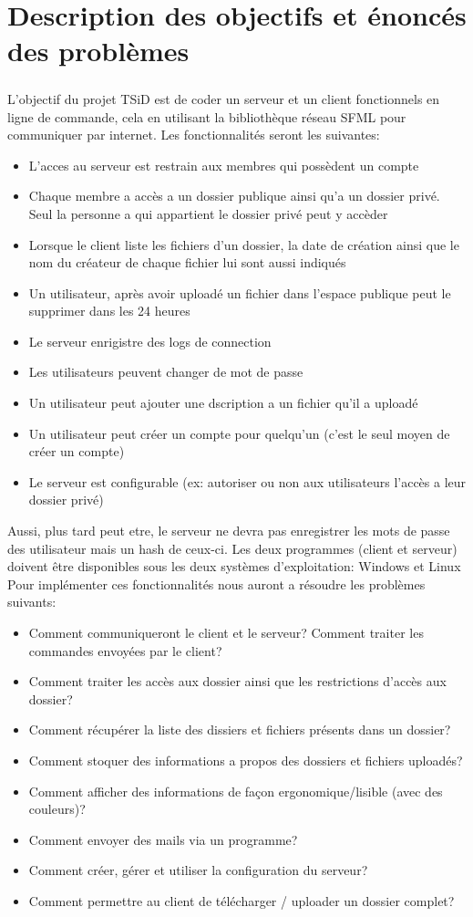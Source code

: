 \documentclass[12pt,a4paper,twoside]{article}
\begin{document}
	\section{Description des objectifs et énoncés des problèmes} %
		\subparagraph*{}
			L'objectif du projet TSiD est de coder un serveur et un client fonctionnels en ligne de commande, cela en utilisant la bibliothèque réseau SFML pour communiquer par internet.
			Les fonctionnalités seront les suivantes:
			\begin{itemize}
				\item{} L'acces au serveur est restrain aux membres qui possèdent un compte
				\item{} Chaque membre a accès a un dossier publique ainsi qu'a un dossier privé. Seul la personne a qui appartient le dossier privé peut y accèder
				\item{} Lorsque le client liste les fichiers d'un dossier, la date de création ainsi que le nom du créateur de chaque fichier lui sont aussi indiqués
				\item{} Un utilisateur, après avoir uploadé un fichier dans l'espace publique peut le supprimer dans les 24 heures
				\item{} Le serveur enrigistre des logs de connection
				\item{} Les utilisateurs peuvent changer de mot de passe
				\item{} Un utilisateur peut ajouter une dscription a un fichier qu'il a uploadé
				\item{} Un utilisateur peut créer un compte pour quelqu'un (c'est le seul moyen de créer un compte)
				\item{} Le serveur est configurable (ex: autoriser ou non aux utilisateurs l'accès a leur dossier privé)
			\end{itemize}
			Aussi, plus tard peut etre, le serveur ne devra pas enregistrer les mots de passe des utilisateur mais un hash de ceux-ci.
			Les deux programmes (client et serveur) doivent être disponibles sous les deux systèmes d'exploitation: Windows et Linux
			Pour implémenter ces fonctionnalités nous auront a résoudre les problèmes suivants:
			\begin{itemize}
				\item{} Comment communiqueront le client et le serveur? Comment traiter les commandes envoyées par le client?
				\item{} Comment traiter les accès aux dossier ainsi que les restrictions d'accès aux dossier?
				\item{} Comment récupérer la liste des dissiers et fichiers présents dans un dossier?
				\item{} Comment stoquer des informations a propos des dossiers et fichiers uploadés?
				\item{} Comment afficher des informations de façon ergonomique/lisible (avec des couleurs)?
				\item{} Comment envoyer des mails via un programme?
				\item{} Comment créer, gérer et utiliser la configuration du serveur?
				\item{} Comment permettre au client de télécharger / uploader un dossier complet?
			\end{itemize}
\end{document}
